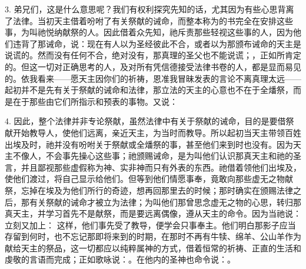 3. 弟兄们，这是什么意思呢？我们有权利探究先知的话，尤其因为有些心思背离了法律。当初天主借着吩咐了有关祭献的诫命，而整本称为的书完全在安排这些事，为叫祂悦纳献祭的人。因此借着众先知，祂斥责那些轻视这些事的人，因为他们违背了那诫命，说：现在有人以为圣经彼此不合，或者以为那颁布诫命的天主是说谎的。然而没有任何不合，绝对没有，那真理的圣父也不能说谎；，正如所肯定的。但这一切对正确思考的人，及对所有凭信德接受法律书卷的人，都是显而易见的。依我看来——愿天主因你们的祈祷，恩准我冒昧发表的言论不离真理太远——起初并不是先有关于祭献的诫命和法律，那立法的天主的心意也不在于全燔祭，而是在于那些由它们所指示和预表的事物。又说：\par

4. 因此，整个法律并非专论祭献，虽然法律中有关于祭献的诫命，目的是要借祭献开始教导人，使他们远离，亲近天主，为当时而教导。所以起初当天主带领百姓出埃及时，祂并没有吩咐关于祭献或全燔祭的事，甚至他们来到时也没有。因为天主不像人，不会事先操心这些事；祂颁赐诫命，是为叫他们认识那真天主和祂的圣言，并且鄙视那些虚假称为神、实非神而只有外表的东西。祂借着领他们出埃及，使他们渡过，将自己显示给他们。但等到他们情愿事奉，竟敢向那些虚无之物献祭，忘掉在埃及为他们所行的奇迹，想再回那里去的时候；那时确实在颁赐法律之后，那有关祭献的诫命才被立为法律；为叫他们那曾思念虚无之物的心思，转归那真天主，并学习首先不是献祭，而是要远离偶像，遵从天主的命令。因为当祂说：立刻又加上： 这样，他们事先受了教导，便学会只事奉主。他们明白那影子应当存留到何时，也不忘记那即将来到的时期，在那时不再有牛犊、绵羊、公山羊作为献给天主的祭品，这一切都应以纯粹属神的方式，借着恒常的祈祷、正直的生活和虔敬的言语而完成；正如歌咏说：。在他内的圣神也命令说：。\par

